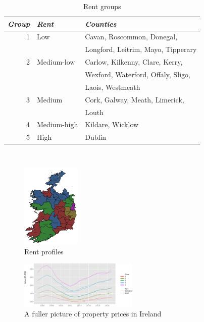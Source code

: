 \documentclass[twocolumn]{article}
\def\justifying{%
  \rightskip=0pt
  \spaceskip=0pt
  \xspaceskip=0pt
  \relax
}
\begin{document}
\begin{table}[h!]
\centering
\raggedright
\begin{tabularx}{0.5\textwidth}{r l l}
    \textit{Group} & \textit{Rent} & \textit{Counties} \\ \hline
    1 & Low & Cavan, Roscommon, Donegal,\\&&Longford, Leitrim, Mayo, Tipperary \\ \hline
    2 & Medium-low & Carlow, Kilkenny, Clare, Kerry,\\&&Wexford, Waterford, Offaly, Sligo,\\&&Laois, Westmeath \\ \hline
    3 & Medium & Cork, Galway, Meath, Limerick,\\&&Louth \\ \hline
    4 & Medium-high & Kildare, Wicklow \\ \hline
    5 & High & Dublin
\end{tabularx} \\
\justifying
\caption{Rent groups\label{rent_group_tab}}
\label{tab:sources}
\end{table}

\begin{figure}[H]
    \centering
    \includegraphics[width=0.25\textwidth]{media/clustered_ireland_map.png}
    \caption{Rent profiles\label{rent_groups}}
\end{figure}

\begin{figure}[h]
    \centering
    \includegraphics[width=0.505\textwidth]{media/pdf/estimated_property_value_by_county_group.svg.pdf}
    \caption{A fuller picture of property prices in Ireland \label{full_pic}}
\end{figure}
\end{document}
